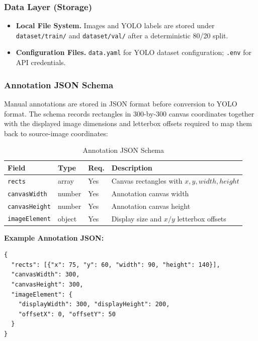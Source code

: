 \documentclass[12pt, letterpaper]{article}
\newcommand{\code}[1]{\texttt{\small\colorbox{codebg}{#1}}}
\begin{document}
\subsubsection{Data Layer (Storage)}

\begin{itemize}
  \item \textbf{Local File System.} Images and YOLO labels are stored under
    \code{dataset/train/} and \code{dataset/val/} after a deterministic 80/20 split.
  \item \textbf{Configuration Files.} \code{data.yaml} for YOLO dataset configuration;
    \code{.env} for API credentials.
\end{itemize}

\subsubsection{Annotation JSON Schema}

Manual annotations are stored in JSON format before conversion to YOLO format. The schema
records rectangles in 300-by-300 canvas coordinates together with the displayed image
dimensions and letterbox offsets required to map them back to source-image coordinates:

\begin{table}[H]
  \centering
  \caption{Annotation JSON Schema}
  \begin{tabularx}{\linewidth}{@{} l l l X @{}}
    \toprule
    \textbf{Field}      & \textbf{Type} & \textbf{Req.} & \textbf{Description} \\
    \midrule
    \code{rects}       & array         & Yes & Canvas rectangles with $x,y,width,height$ \\
    \code{canvasWidth} & number        & Yes & Annotation canvas width \\
    \code{canvasHeight}& number        & Yes & Annotation canvas height \\
    \code{imageElement}& object        & Yes & Display size and $x/y$ letterbox offsets \\
    \bottomrule
  \end{tabularx}
\end{table}

\textbf{Example Annotation JSON:}
\begin{verbatim}
{
  "rects": [{"x": 75, "y": 60, "width": 90, "height": 140}],
  "canvasWidth": 300,
  "canvasHeight": 300,
  "imageElement": {
    "displayWidth": 300, "displayHeight": 200,
    "offsetX": 0, "offsetY": 50
  }
}
\end{verbatim}
\end{document}
